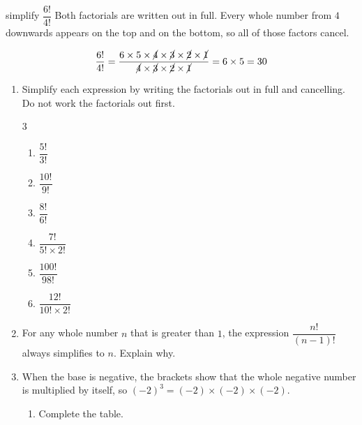 \documentclass[12pt,a4paper]{article}
\newcommand{\ansline}[1][2.2cm]{\underline{\hspace{#1}}}
\begin{document}
\begin{wex}{simplify $\dfrac{6!}{4!}$}
\small
Both factorials are written out in full. Every whole number from $4$ downwards
appears on the top and on the bottom, so all of those factors cancel.

\smallskip
\[\frac{6!}{4!}
  =\frac{6\times5\times\cancel{4}\times\cancel{3}\times\cancel{2}\times\cancel{1}}
   {\cancel{4}\times\cancel{3}\times\cancel{2}\times\cancel{1}}
  =6\times5=30\]
\end{wex}

\begin{enumerate}[resume]

\item Simplify each expression by writing the factorials out in full and
cancelling. Do not work the factorials out first.
\begin{multicols}{3}
\begin{enumerate}
  \item $\dfrac{5!}{3!}$
  \item $\dfrac{10!}{9!}$
  \item $\dfrac{8!}{6!}$
  \item $\dfrac{7!}{5!\times2!}$
  \item $\dfrac{100!}{98!}$
  \item $\dfrac{12!}{10!\times2!}$
\end{enumerate}
\end{multicols}
\vspace{9em}

\item For any whole number $n$ that is greater than $1$, the expression
$\dfrac{n!}{(n-1)!}$ always simplifies to $n$. Explain why.

\vspace{6pt}
\ansline[16cm]

\vspace{16pt}
\ansline[16cm]

\vspace{16pt}
\ansline[16cm]

\newpage{}

\item When the base is negative, the brackets show that the whole negative
number is multiplied by itself, so $(-2)^3=(-2)\times(-2)\times(-2)$.
\begin{enumerate}
  \item Complete the table.


\end{enumerate}
\end{enumerate}
\end{document}
